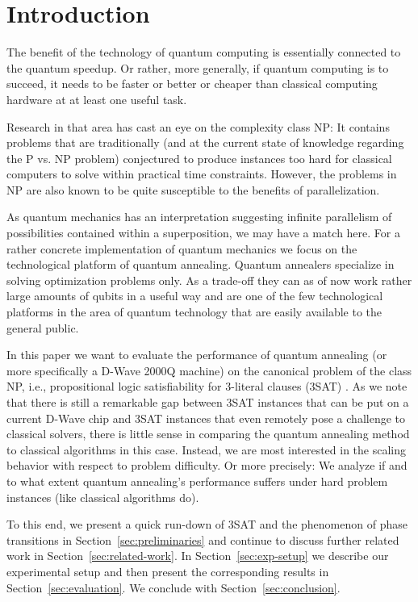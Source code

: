 \section{Introduction}

The benefit of the technology of quantum computing is essentially connected to the quantum speedup. Or rather, more generally, if quantum computing is to succeed, it needs to be faster or better or cheaper than classical computing hardware at at least one useful task.

Research in that area has cast an eye on the complexity class NP: It contains problems that are traditionally (and at the current state of knowledge regarding the P vs. NP problem) conjectured to produce instances too hard for classical computers to solve within practical time constraints. However, the problems in NP are also known to be quite susceptible to the benefits of parallelization.

As quantum mechanics has an interpretation suggesting infinite parallelism of possibilities contained within a superposition, we may have a match here. For a rather concrete implementation of quantum mechanics we focus on the technological platform of quantum annealing. Quantum annealers specialize in solving optimization problems only. As a trade-off they can as of now work rather large amounts of qubits in a useful way and are one of the few technological platforms in the area of quantum technology that are easily available to the general public.

In this paper we want to evaluate the performance of quantum annealing (or more specifically a D-Wave 2000Q machine) on the canonical problem of the class NP, i.e., propositional logic satisfiability for 3-literal clauses (3SAT) \cite{cook1971complexity}. As we note that there is still a remarkable gap between 3SAT instances that can be put on a current D-Wave chip and 3SAT instances that even remotely pose a challenge to classical solvers, there is little sense in comparing the quantum annealing method to classical algorithms in this case. Instead, we are most interested in the scaling behavior with respect to problem difficulty. Or more precisely: We analyze if and to what extent quantum annealing's performance suffers under hard problem instances (like classical algorithms do).

To this end, we present a quick run-down of 3SAT and the phenomenon of phase transitions in Section~\ref{sec:preliminaries} and continue to discuss further related work in Section~\ref{sec:related-work}. In Section~\ref{sec:exp-setup} we describe our experimental setup and then present the corresponding results in Section~\ref{sec:evaluation}. We conclude with Section~\ref{sec:conclusion}.
